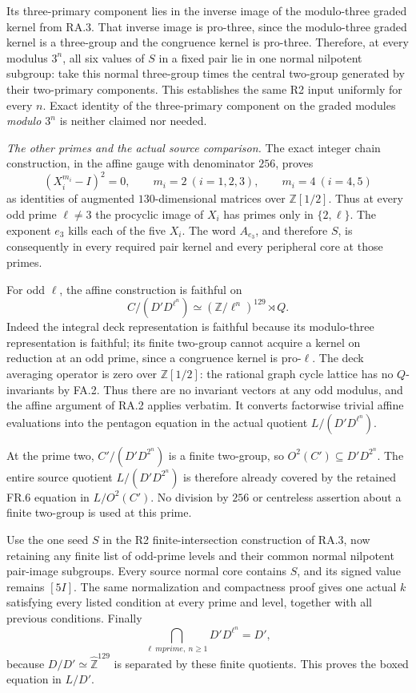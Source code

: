 Its three-primary component lies in the inverse image
of the modulo-three graded kernel from RA.3.  That
inverse image is pro-three, since the modulo-three
graded kernel is a three-group and the congruence
kernel is pro-three.  Therefore, at every modulus
$3^n$, all six values of $S$ in a fixed pair lie in
one normal nilpotent subgroup: take this normal
three-group times the central two-group generated by
their two-primary components.  This establishes the
same R2 input uniformly for every $n$.  Exact identity
of the three-primary component on the graded modules
\emph{modulo $3^n$} is neither claimed nor needed.

\emph{The other primes and the actual source comparison.}
The exact integer chain construction, in the affine
gauge with denominator $256$, proves
\[
 (X_i^{m_i}-I)^2=0,\qquad
 m_i=2\ (i=1,2,3),\qquad m_i=4\ (i=4,5)
\]
as identities of augmented $130$-dimensional matrices
over $\mathbb Z[1/2]$.  Thus at every odd prime
$\ell\ne3$ the procyclic image of $X_i$ has primes
only in $\{2,\ell\}$.  The exponent $e_3$ kills each
of the five $X_i$.  The word $A_{e_3}$, and therefore
$S$, is consequently in every required pair kernel
and every peripheral core at those primes.

For odd $\ell$, the affine construction is faithful
on
\[
 C/(D'D^{\ell^n})\simeq
       (\mathbb Z/\ell^n)^{129}\rtimes Q.
\]
Indeed the integral deck representation is faithful
because its modulo-three representation is faithful;
its finite two-group cannot acquire a kernel on
reduction at an odd prime, since a congruence kernel
is pro-$\ell$.  The deck averaging operator is zero
over $\mathbb Z[1/2]$: the rational graph cycle lattice
has no $Q$-invariants by FA.2.  Thus there are no invariant
vectors at any odd modulus, and the affine argument
of RA.2 applies verbatim.  It converts factorwise
trivial affine evaluations into the pentagon equation
in the actual quotient $L/(D'D^{\ell^n})$.

At the prime two, $C'/(D'D^{2^n})$ is a finite
two-group, so
$O^2(C')\subseteq D'D^{2^n}$.  The entire source
quotient $L/(D'D^{2^n})$ is therefore already covered
by the retained FR.6 equation in $L/O^2(C')$.
No division by $256$ or centreless assertion about a
finite two-group is used at this prime.

Use the one seed $S$ in the R2 finite-intersection
construction of RA.3, now retaining any finite list
of odd-prime levels and their common normal nilpotent
pair-image subgroups.  Every source normal core
contains $S$, and its signed value remains $[5I]$.
The same normalization and compactness proof gives
one actual $k$ satisfying every listed condition at
every prime and level, together with all previous
conditions.  Finally
\[
 \bigcap_{\ell\ {
m prime},\ n\ge1}
         D'D^{\ell^n}=D',
\]
because $D/D'\simeq\widehat{\mathbb Z}^{129}$ is
separated by these finite quotients.  This proves the
boxed equation in $L/D'$.

